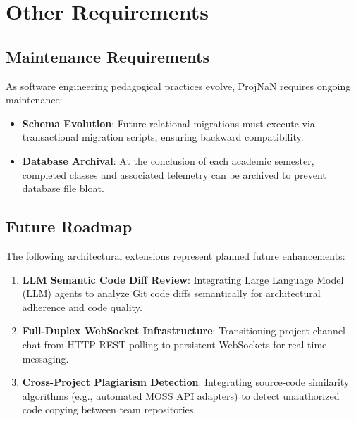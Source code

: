 \documentclass{scrreprt}
\begin{document}
\chapter{Other Requirements}\label{chap:other_requirements}

\section{Maintenance Requirements}\label{sec:maintenance}
As software engineering pedagogical practices evolve, ProjNaN requires ongoing maintenance:
\begin{itemize}
    \item \textbf{Schema Evolution}: Future relational migrations must execute via transactional migration scripts, ensuring backward compatibility.
    \item \textbf{Database Archival}: At the conclusion of each academic semester, completed classes and associated telemetry can be archived to prevent database file bloat.
\end{itemize}

\section{Future Roadmap}\label{sec:future_roadmap}
The following architectural extensions represent planned future enhancements:
\begin{enumerate}
    \item \textbf{LLM Semantic Code Diff Review}: Integrating Large Language Model (LLM) agents to analyze Git code diffs semantically for architectural adherence and code quality.
    \item \textbf{Full-Duplex WebSocket Infrastructure}: Transitioning project channel chat from HTTP REST polling to persistent WebSockets for real-time messaging.
    \item \textbf{Cross-Project Plagiarism Detection}: Integrating source-code similarity algorithms (e.g., automated MOSS API adapters) to detect unauthorized code copying between team repositories.
\end{enumerate}
\end{document}
